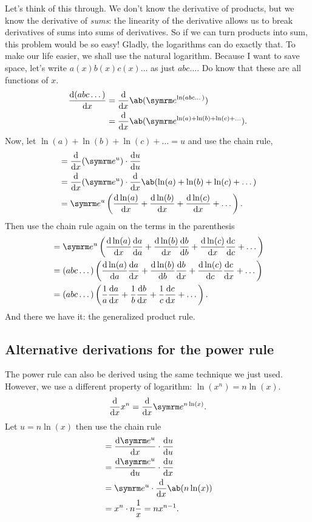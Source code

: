 Let's think of this through. We don't know the derivative of products, but we know the derivative of \emph{sums}: the linearity of the derivative allows us to break derivatives of sums into sums of derivatives. So if we can turn products into sum, this problem would be so easy! Gladly, the logarithms can do exactly that. To make our life easier, we shall use the natural logarithm. Because I want to save space, let's write $a(x)b(x)c(x)\dots$ as just $abc\dots$. Do know that these are all functions of $x$.
\begin{align*}
  \odv{(abc\dots)}{x} & = \odv*{\ab(\e^{\ln(abc\dots)})}{x}                      \\
                      & = \odv*{\ab(\e^{\ln(a) + \ln(b) + \ln(c) + \dots})}{x}.
\end{align*}
Now, let $\ln(a) + \ln(b) + \ln(c) + \dots = u$ and use the chain rule,
\begin{align*}
   & = \odv*{(\e^u)}{x} \cdot \odv{u}{u}                                               \\
   & = \odv*{(\e^u)}{x} \cdot \odv*{\ab(\ln(a) + \ln(b) + \ln(c) + \dots)}{x}          \\
   & = \e^u \left(\odv{\ln(a)}{x} + \odv{\ln(b)}{x} + \odv{\ln(c)}{x} + \dots\right).
\end{align*}
Then use the chain rule again on the terms in the parenthesis
\begin{align*}
   & = \e^u \left(\odv{\ln(a)}{x}\odv{a}{a} + \odv{\ln(b)}{x}\odv{b}{b} + \odv{\ln(c)}{x}\odv{c}{c} + \dots\right)      \\
   & = (abc\dots)\left(\odv{\ln(a)}{a}\odv{a}{x} + \odv{\ln(b)}{b}\odv{b}{x} + \odv{\ln(c)}{c}\odv{c}{x} + \dots\right) \\
   & = (abc\dots)\left(\frac{1}{a}\odv{a}{x} + \frac{1}{b}\odv{b}{x} + \frac{1}{c}\odv{c}{x} + \dots\right).
\end{align*}
And there we have it: the generalized product rule.

\subsection{Alternative derivations for the power rule}

The power rule can also be derived using the same technique we just used. However, we use a different property of logarithm: $\ln(x^n) = n\ln(x)$.
\begin{equation*}
  \odv*{x^n}{x} = \odv*{\e^{n\ln(x)}}{x}.
\end{equation*}
Let $u = n\ln(x)$ then use the chain rule
\begin{align*}
   & = \odv{\e^u}{x} \cdot \odv{u}{u}        \\
   & = \odv{\e^u}{u} \cdot \odv{u}{x}        \\
   & = \e^u \cdot \odv*{\ab(n\ln(x))}{x}     \\
   & = x^n \cdot n\frac{1}{x} = nx^{n - 1}.
\end{align*}

